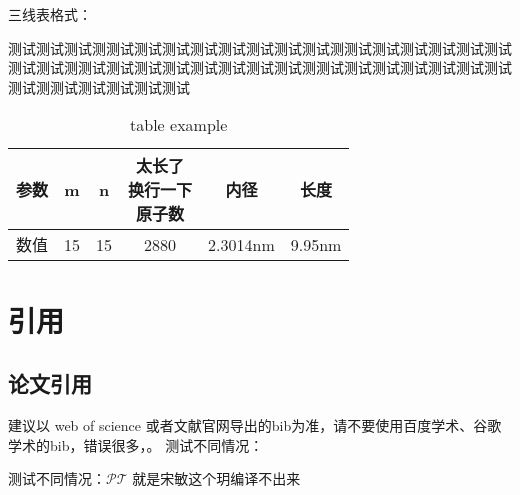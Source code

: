 \documentclass[AutoFakeBold]{LZUThesis-PgD&PhD}
\begin{document}
三线表格式：

测试测试测试测测试测试测试测试测试测试测试测试测测试测试测试测试测试测试测试测试测测试测试测试测试测试测试测试测试测测试测试测试测试测试测试测试测试测测试测试测试测试测试


\begin{table}[hbt!]\label{tbl:mole}
  \centering
  \begin{tabular*}{0.9\textwidth}{@{\extracolsep{\fill}}cccccc}
    \toprule
    参数& m & n & \tabincell{c}{太长了\\换行一下\\原子数}  & 内径 & 长度\\
    \midrule
    数值 & 15 & 15  & 2880 & 2.3014nm & 9.95nm \\
    \bottomrule
  \end{tabular*}
  \caption{table example}
\end{table}


\section{引用}

\subsection{论文引用}

建议以 web of science 或者文献官网导出的bib为准，请不要使用百度学术、谷歌学术的bib，错误很多，\cite{partl2016, tenne1992polyhedral, tussyadiah2015hotels}。
测试不同情况：

测试不同情况：$\mathcal{P}\mathcal{T}$ 就是宋敏这个玥编译不出来
\end{document}

